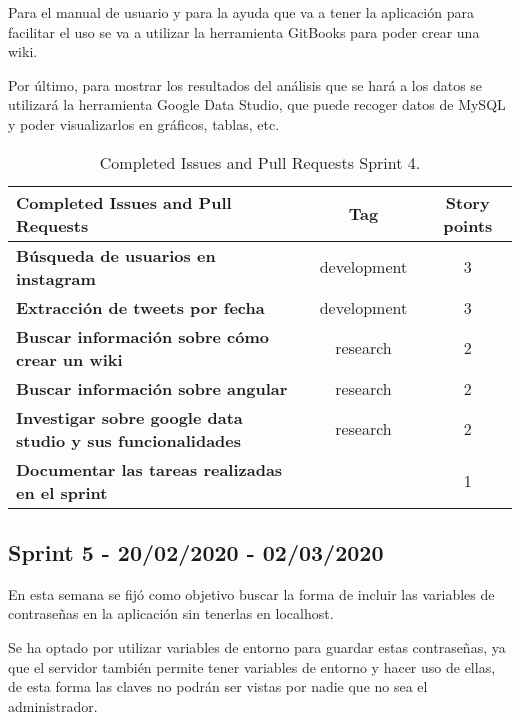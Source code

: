 Para el manual de usuario y para la ayuda que va a tener la aplicación para facilitar el uso se va a utilizar la herramienta GitBooks para poder crear una wiki.

Por último, para mostrar los resultados del análisis que se hará a los datos se utilizará la herramienta Google Data Studio, que puede recoger datos de MySQL y poder visualizarlos en gráficos, tablas, etc.


\begin{table}[ht!]
    \centering
    \resizebox{15cm}{!} {
    \begin{tabular}{|l|c|c|}
    \hline
    \rowcolor[rgb]{0.81,0.81,0.77}
    \textbf{Completed Issues and Pull Requests}     &\textbf{Tag}     & \textbf{Story points} \\ \hline
    \textbf{Búsqueda de usuarios en instagram}         &\cellcolor[rgb]{0.69,0.93,0.93}development      &3 \\ \hline 
    \textbf{Extracción de tweets por fecha}         &\cellcolor[rgb]{0.69,0.93,0.93}development      &3 \\ \hline
    \textbf{Buscar información sobre cómo crear un wiki}         &\cellcolor[rgb]{0.6,1.0,0.6}research      &2 \\ \hline 
    \textbf{Buscar información sobre angular}         &\cellcolor[rgb]{0.6,1.0,0.6}research      &2 \\ \hline 
    \textbf{Investigar sobre google data studio y sus funcionalidades}         &\cellcolor[rgb]{0.6,1.0,0.6}research      &2 \\ \hline 
    \textbf{Documentar las tareas realizadas en el sprint}         &\cellcolor[rgb]{0.0,0.33,0.71}\textcolor{white}{documentation}     &1 \\ \hline 
    \end{tabular}}
    \caption{Completed Issues and Pull Requests Sprint 4.}
    \label{tab:my_label}
\end{table}

\subsection{Sprint 5 - 20/02/2020 - 02/03/2020}
En esta semana se fijó como objetivo buscar la forma de incluir las variables de contraseñas en la aplicación sin tenerlas en localhost. 

Se ha optado por utilizar variables de entorno para guardar estas contraseñas, ya que el servidor también permite tener variables de entorno y hacer uso de ellas, de esta forma las claves no podrán ser vistas por nadie que no sea el administrador.

